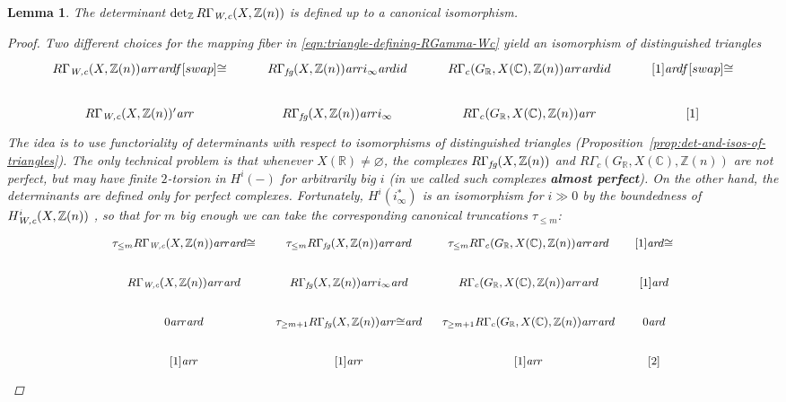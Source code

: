 \documentclass[10pt,a4paper,oneside,draft]{article}
\newcommand{\CC}{\mathbb{C}}
\newcommand{\RR}{\mathbb{R}}
\newcommand{\ZZ}{\mathbb{Z}}
\renewcommand{\det}{\operatorname{det}}
\renewcommand{\emptyset}{\varnothing}
\newcommand{\ar}{\text{\it ar}}
\newcommand{\fg}{\text{\it fg}}
\newcommand{\Wc}{\text{\it W,c}}
\theoremstyle{myplain}
\newtheorem{lemma}[theorem]{Lemma}
\theoremstyle{mydefinition}
\numberwithin{equation}{section}
\begin{document}
\begin{lemma}
  \label{lemma:determinant-of-RGamma-Wc-well-defined}
  The determinant $\det_\ZZ R\Gamma_\Wc (X, \ZZ(n))$ is defined up to a
  canonical isomorphism.

  \begin{proof}
    Two different choices for the mapping fiber in
    \eqref{eqn:triangle-defining-RGamma-Wc} yield an isomorphism of
    distinguished triangles
    \[ \begin{tikzcd}
        R\Gamma_\Wc (X, \ZZ(n)) \ar{r}\ar{d}{f}[swap]{\cong} & R\Gamma_\fg (X,\ZZ(n)) \ar{r}{i_\infty}\ar{d}{id} & R\Gamma_c (G_\RR, X (\CC), \ZZ (n)) \ar{r}\ar{d}{id} & {[1]}\ar{d}{f}[swap]{\cong} \\
        R\Gamma_\Wc (X, \ZZ(n))' \ar{r} & R\Gamma_\fg (X,\ZZ(n)) \ar{r}{i_\infty} & R\Gamma_c (G_\RR, X (\CC), \ZZ (n)) \ar{r} & {[1]}
      \end{tikzcd} \]
    The idea is to use functoriality of determinants with respect to
    isomorphisms of distinguished triangles
    (Proposition~\ref{prop:det-and-isos-of-triangles}). The only technical problem
    is that whenever $X (\RR) \ne \emptyset$, the complexes
    $R\Gamma_\fg (X,\ZZ(n))$ and $R\Gamma_c (G_\RR, X (\CC), \ZZ (n))$ are not
    perfect, but may have finite $2$-torsion in $H^i (-)$ for arbitrarily big
    $i$ (in \cite{Beshenov-Weil-etale-1} we called such complexes
    \textbf{almost perfect}). On the other hand, the determinants are defined
    only for perfect complexes. Fortunately, $H^i (i_\infty^*)$ is an
    isomorphism for $i \gg 0$ by the boundedness of $H^i_\Wc (X, \ZZ(n))$
    \cite[Proposition~7.12]{Beshenov-Weil-etale-1}, so that for $m$ big enough
    we can take the corresponding canonical truncations $\tau_{\le m}$:
    \[ \begin{tikzcd}[row sep=1.5em, column sep=0.75em, font=\small]
        \tau_{\le m} R\Gamma_\Wc (X, \ZZ(n)) \ar{r}\ar{d}{\cong} & \tau_{\le m} R\Gamma_\fg (X,\ZZ(n)) \ar{r}\ar{d} & \tau_{\le m} R\Gamma_c (G_\RR, X (\CC), \ZZ (n)) \ar{r}\ar{d} & {[1]}\ar{d}{\cong} \\
        R\Gamma_\Wc (X, \ZZ(n)) \ar{r}\ar{d} & R\Gamma_\fg (X,\ZZ(n)) \ar{r}{i_\infty}\ar{d} & R\Gamma_c (G_\RR, X (\CC), \ZZ (n)) \ar{r}\ar{d} & {[1]}\ar{d} \\
        0 \ar{r}\ar{d} & \tau_{\ge m+1} R\Gamma_\fg (X,\ZZ(n)) \ar{r}{\cong}\ar{d} & \tau_{\ge m+1} R\Gamma_c (G_\RR, X (\CC), \ZZ (n)) \ar{r}\ar{d} & 0\ar{d} \\
        {[1]} \ar{r} & {[1]} \ar{r} & {[1]} \ar{r} & {[2]}
      \end{tikzcd} \]


\end{proof}
\end{lemma}
\end{document}
